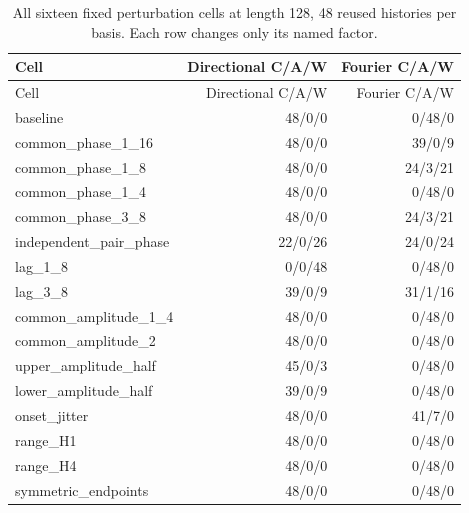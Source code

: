 \begin{longtable}{P{66mm}rr}
\caption{All sixteen fixed perturbation cells at length 128, 48 reused histories per basis. Each row changes only its named factor.}\\
\toprule Cell & Directional C/A/W & Fourier C/A/W\\\midrule\endfirsthead
\toprule Cell & Directional C/A/W & Fourier C/A/W\\\midrule\endhead
baseline & 48/0/0 & 0/48/0\\
common\_phase\_1\_16 & 48/0/0 & 39/0/9\\
common\_phase\_1\_8 & 48/0/0 & 24/3/21\\
common\_phase\_1\_4 & 48/0/0 & 0/48/0\\
common\_phase\_3\_8 & 48/0/0 & 24/3/21\\
independent\_pair\_phase & 22/0/26 & 24/0/24\\
lag\_1\_8 & 0/0/48 & 0/48/0\\
lag\_3\_8 & 39/0/9 & 31/1/16\\
common\_amplitude\_1\_4 & 48/0/0 & 0/48/0\\
common\_amplitude\_2 & 48/0/0 & 0/48/0\\
upper\_amplitude\_half & 45/0/3 & 0/48/0\\
lower\_amplitude\_half & 39/0/9 & 0/48/0\\
onset\_jitter & 48/0/0 & 41/7/0\\
range\_H1 & 48/0/0 & 0/48/0\\
range\_H4 & 48/0/0 & 0/48/0\\
symmetric\_endpoints & 48/0/0 & 0/48/0\\
\bottomrule\end{longtable}
